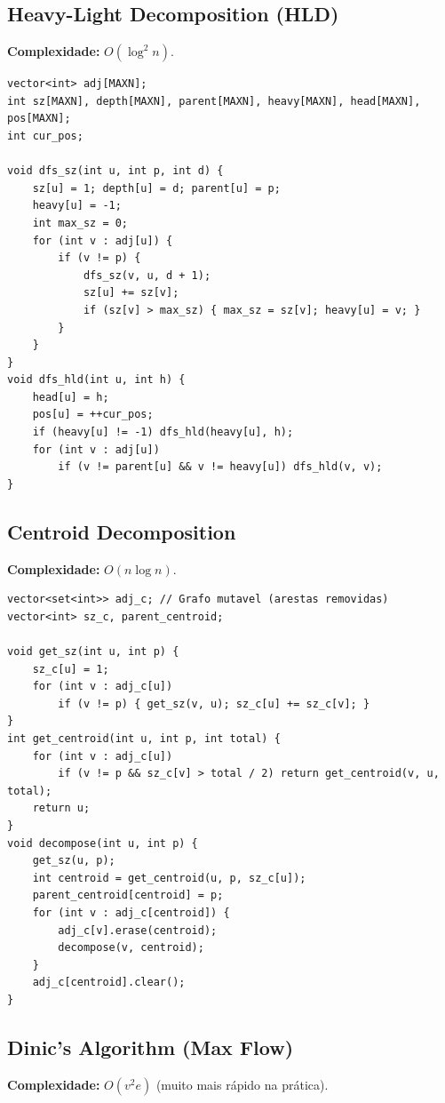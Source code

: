 \subsection{Heavy-Light Decomposition (HLD)}

\textbf{Complexidade:} $O(\log^2 n)$.

\begin{lstlisting}
vector<int> adj[MAXN];
int sz[MAXN], depth[MAXN], parent[MAXN], heavy[MAXN], head[MAXN], pos[MAXN];
int cur_pos;

void dfs_sz(int u, int p, int d) {
    sz[u] = 1; depth[u] = d; parent[u] = p;
    heavy[u] = -1;
    int max_sz = 0;
    for (int v : adj[u]) {
        if (v != p) {
            dfs_sz(v, u, d + 1);
            sz[u] += sz[v];
            if (sz[v] > max_sz) { max_sz = sz[v]; heavy[u] = v; }
        }
    }
}
void dfs_hld(int u, int h) {
    head[u] = h;
    pos[u] = ++cur_pos;
    if (heavy[u] != -1) dfs_hld(heavy[u], h);
    for (int v : adj[u]) 
        if (v != parent[u] && v != heavy[u]) dfs_hld(v, v);
}
\end{lstlisting}


\subsection{Centroid Decomposition}

\textbf{Complexidade:} $O(n \log n)$.

\begin{lstlisting}
vector<set<int>> adj_c; // Grafo mutavel (arestas removidas)
vector<int> sz_c, parent_centroid;

void get_sz(int u, int p) {
    sz_c[u] = 1;
    for (int v : adj_c[u])
        if (v != p) { get_sz(v, u); sz_c[u] += sz_c[v]; }
}
int get_centroid(int u, int p, int total) {
    for (int v : adj_c[u])
        if (v != p && sz_c[v] > total / 2) return get_centroid(v, u, total);
    return u;
}
void decompose(int u, int p) {
    get_sz(u, p);
    int centroid = get_centroid(u, p, sz_c[u]);
    parent_centroid[centroid] = p;
    for (int v : adj_c[centroid]) {
        adj_c[v].erase(centroid);
        decompose(v, centroid);
    }
    adj_c[centroid].clear();
}
\end{lstlisting}


\subsection{Dinic's Algorithm (Max Flow)}

\textbf{Complexidade:} $O(v^2 e)$ (muito mais rápido na prática).


